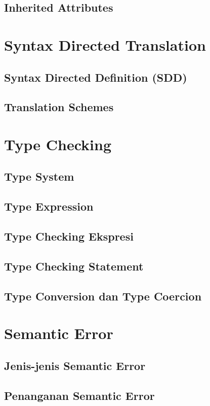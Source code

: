 \documentclass{book}
\begin{document}
         \subsection{Inherited Attributes}
    \section{Syntax Directed Translation}
         \subsection{Syntax Directed Definition (SDD)}
         \subsection{Translation Schemes}
    \section{Type Checking}
         \subsection{Type System}
         \subsection{Type Expression}
         \subsection{Type Checking Ekspresi}
         \subsection{Type Checking Statement}
         \subsection{Type Conversion dan Type Coercion}
    \section{Semantic Error}
         \subsection{Jenis-jenis Semantic Error}
         \subsection{Penanganan Semantic Error}
        
\end{document}
